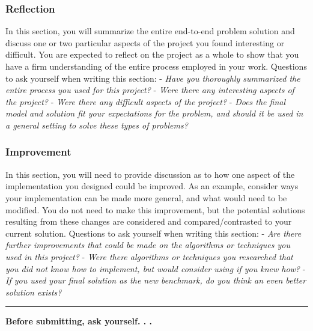 \documentclass[
]{article}
\begin{document}
\hypertarget{reflection}{%
\subsubsection{Reflection}\label{reflection}}

In this section, you will summarize the entire end-to-end problem
solution and discuss one or two particular aspects of the project you
found interesting or difficult. You are expected to reflect on the
project as a whole to show that you have a firm understanding of the
entire process employed in your work. Questions to ask yourself when
writing this section: - \emph{Have you thoroughly summarized the entire
process you used for this project?} - \emph{Were there any interesting
aspects of the project?} - \emph{Were there any difficult aspects of the
project?} - \emph{Does the final model and solution fit your
expectations for the problem, and should it be used in a general setting
to solve these types of problems?}

\hypertarget{improvement}{%
\subsubsection{Improvement}\label{improvement}}

In this section, you will need to provide discussion as to how one
aspect of the implementation you designed could be improved. As an
example, consider ways your implementation can be made more general, and
what would need to be modified. You do not need to make this
improvement, but the potential solutions resulting from these changes
are considered and compared/contrasted to your current solution.
Questions to ask yourself when writing this section: - \emph{Are there
further improvements that could be made on the algorithms or techniques
you used in this project?} - \emph{Were there algorithms or techniques
you researched that you did not know how to implement, but would
consider using if you knew how?} - \emph{If you used your final solution
as the new benchmark, do you think an even better solution exists?}

\begin{center}\rule{0.5\linewidth}{0.5pt}\end{center}

\textbf{Before submitting, ask yourself. . .}
\end{document}
